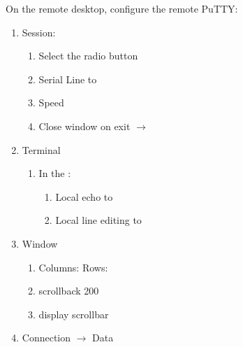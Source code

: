 On the remote desktop, configure the remote PuTTY:

\vspace{-.15cm}
\begin{enumerate}\addtolength{\itemsep}{-0.5\baselineskip}
   \item   Session:
\vspace{-.15cm}
\begin{enumerate}\addtolength{\itemsep}{-0.5\baselineskip}
   \item   Select the  radio button
   \item   Serial Line to 
   \item   Speed 
   \item   Close window on exit $\rightarrow$ 
\end{enumerate}
   \item   Terminal
\vspace{-.15cm}
\begin{enumerate}\addtolength{\itemsep}{-0.5\baselineskip}
   \item   In the :
\vspace{-.15cm}
\begin{enumerate}\addtolength{\itemsep}{-0.5\baselineskip}
   \item  Local echo to 
   \item  Local line editing to 
\end{enumerate}
\end{enumerate}
   \item   Window
\vspace{-.15cm}
\begin{enumerate}\addtolength{\itemsep}{-0.5\baselineskip}
   \item   Columns:  Rows: 
   \item   scrollback 200
   \item   display scrollbar
\end{enumerate}
   \item   Connection $\rightarrow$ Data
\vspace{-.15cm}
\begin{enumerate}\addtolength{\itemsep}{-0.5\baselineskip}

\end{enumerate}
\end{enumerate}
